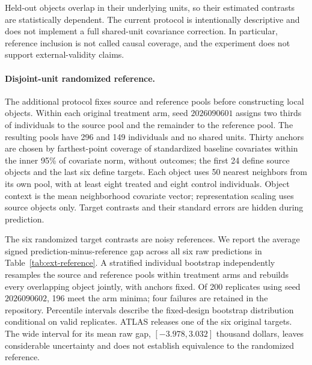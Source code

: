 \documentclass[11pt]{article}
\numberwithin{equation}{section}
\newcommand{\1}{\mathbf 1}
\begin{document}
Held-out objects overlap in their underlying units, so their estimated contrasts are statistically dependent.  The current protocol is intentionally descriptive and does not implement a full shared-unit covariance correction.  In particular, reference inclusion is not called causal coverage, and the experiment does not support external-validity claims.


\paragraph{Disjoint-unit randomized reference.}
The additional protocol fixes source and reference pools before constructing local objects. Within each original treatment arm, seed $2026090601$ assigns two thirds of individuals to the source pool and the remainder to the reference pool. The resulting pools have 296 and 149 individuals and no shared units. Thirty anchors are chosen by farthest-point coverage of standardized baseline covariates within the inner 95\% of covariate norm, without outcomes; the first 24 define source objects and the last six define targets. Each object uses 50 nearest neighbors from its own pool, with at least eight treated and eight control individuals. Object context is the mean neighborhood covariate vector; representation scaling uses source objects only. Target contrasts and their standard errors are hidden during prediction.

\begin{sloppypar}
The six randomized target contrasts are noisy references. We report the average signed prediction-minus-reference gap across all six raw predictions in Table~\ref{tab:ext-reference}. A stratified individual bootstrap independently resamples the source and reference pools within treatment arms and rebuilds every overlapping object jointly, with anchors fixed. Of 200 replicates using seed $2026090602$, 196 meet the arm minima; four failures are retained in the repository. Percentile intervals describe the fixed-design bootstrap distribution conditional on valid replicates. ATLAS releases one of the six original targets. The wide interval for its mean raw gap, $[-3.978,3.032]$ thousand dollars, leaves considerable uncertainty and does not establish equivalence to the randomized reference.
\end{sloppypar}


\end{document}
